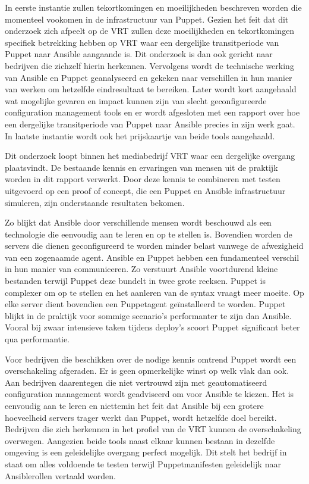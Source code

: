 In eerste instantie zullen tekortkomingen en moeilijkheden beschreven worden die momenteel vookomen in de infrastructuur van Puppet. Gezien het feit dat dit onderzoek zich afpeelt op de \gls{VRT} zullen deze moeilijkheden en tekortkomingen specifiek betrekking hebben op \gls{VRT} waar een dergelijke transitperiode van Puppet naar Ansible aangaande is. Dit onderzoek is dan ook gericht naar bedrijven die zichzelf hierin herkennen. Vervolgens wordt de technische werking van Ansible en Puppet geanalyseerd en gekeken naar verschillen in hun manier van werken om hetzelfde eindresultaat te bereiken. Later wordt kort aangehaald wat mogelijke gevaren en impact kunnen zijn van slecht geconfigureerde configuration management tools en er wordt afgesloten met een rapport over hoe een dergelijke transitperiode van Puppet naar Ansible precies in zijn werk gaat. In laatste instantie wordt ook het prijskaartje van beide tools aangehaald.

Dit onderzoek loopt binnen het mediabedrijf \gls{VRT} waar een dergelijke overgang plaatsvindt. De bestaande kennis en ervaringen van mensen uit de praktijk worden in dit rapport verwerkt. Door deze kennis te combineren met testen uitgevoerd op een proof of concept, die een Puppet en Ansible infrastructuur simuleren, zijn onderstaande resultaten bekomen.

Zo blijkt dat Ansible door verschillende mensen wordt beschouwd als een technologie die eenvoudig aan te leren en op te stellen is. Bovendien worden de servers die dienen geconfigureerd te worden minder belast vanwege de afwezigheid van een zogenaamde agent. Ansible en Puppet hebben een fundamenteel verschil in hun manier van communiceren. Zo verstuurt Ansible voortdurend kleine bestanden terwijl Puppet deze bundelt in twee grote reeksen. Puppet is complexer om op te stellen en het aanleren van de syntax vraagt meer moeite. Op elke server dient bovendien een Puppetagent ge\"installeerd te worden.  Puppet blijkt in de praktijk voor sommige scenario's performanter te zijn dan Ansible. Vooral bij zwaar intensieve taken tijdens deploy's scoort Puppet significant beter qua performantie.

Voor bedrijven die beschikken over de nodige kennis omtrend Puppet wordt een overschakeling afgeraden. Er is geen opmerkelijke winst op welk vlak dan ook. Aan bedrijven daarentegen die niet vertrouwd zijn met geautomatiseerd configuration management  wordt geadviseerd om voor Ansible te kiezen. Het is eenvoudig aan te leren en niettemin het feit dat Ansible bij een grotere hoeveelheid servers trager werkt dan Puppet, wordt hetzelfde doel bereikt. Bedrijven die zich herkennen in het profiel van de \gls{VRT} kunnen de overschakeling overwegen. Aangezien beide tools naast elkaar kunnen bestaan in dezelfde omgeving is een geleidelijke overgang perfect mogelijk. Dit stelt het bedrijf in staat om alles voldoende te testen terwijl Puppetmanifesten geleidelijk naar Ansiblerollen vertaald worden.

